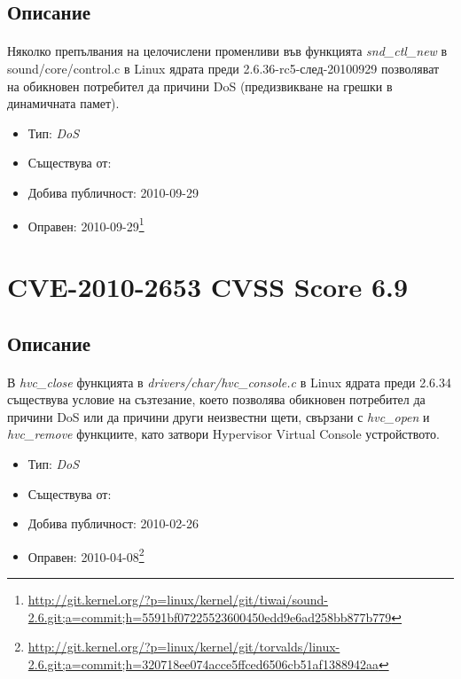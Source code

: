 \documentclass[a4paper,12pt,leqno]{article}
\begin{document}
\subsection{Описание}
\paragraph{}
Няколко препълвания на целочислени променливи във функцията \textit{snd\_ctl\_new} в sound/core/control.c в Linux ядрата преди 2.6.36-rc5-след-20100929 позволяват на обикновен потребител да причини DoS (предизвикване на грешки в динамичната памет).

\begin{itemize}
    \item Тип: \textit{DoS}
    \item Съществува от:
  	\item Добива публичност: 2010-09-29
    \item Оправен: 2010-09-29\footnote{\url{http://git.kernel.org/?p=linux/kernel/git/tiwai/sound-2.6.git;a=commit;h=5591bf07225523600450edd9e6ad258bb877b779}}
\end{itemize}

\section{CVE-2010-2653 CVSS Score 6.9}
\subsection{Описание}
\paragraph{}
В \textit{hvc\_close} функцията в \textit{drivers/char/hvc\_console.c} в Linux ядрата преди 2.6.34 съществува условие на съзтезание, което позволява обикновен потребител да причини DoS или да причини други неизвестни щети, свързани с \textit{hvc\_open} и \textit{hvc\_remove} функциите, като затвори Hypervisor Virtual Console устройството.

\begin{itemize}
    \item Тип: \textit{DoS}
    \item Съществува от:
  	\item Добива публичност: 2010-02-26
    \item Оправен: 2010-04-08\footnote{\url{http://git.kernel.org/?p=linux/kernel/git/torvalds/linux-2.6.git;a=commit;h=320718ee074acce5ffced6506cb51af1388942aa}}
\end{itemize}
\end{document}
